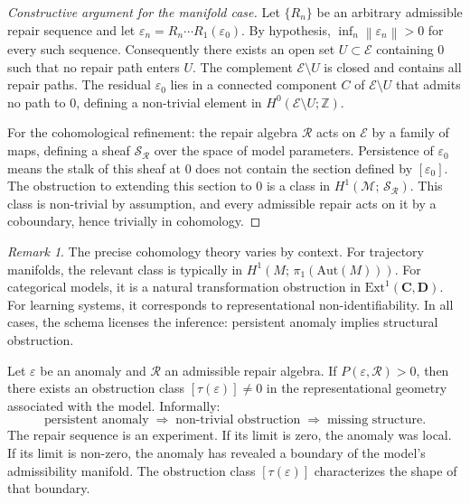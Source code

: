 \documentclass[12pt,oneside]{book}
\theoremstyle{plain}
\theoremstyle{definition}
\theoremstyle{remark}
\newtheorem{remark}[theorem]{Remark}
\newcommand{\R}{\mathcal{R}}
\newcommand{\M}{\mathcal{M}}
\newcommand{\eps}{\varepsilon}
\newcommand{\cat}[1]{\mathbf{#1}}
\newcommand{\norm}[1]{\left\lVert #1 \right\rVert}
\newcommand{\1}{\mathbf{1}}
\begin{document}
\begin{proof}[Constructive argument for the manifold case]
Let $\{R_n\}$ be an arbitrary admissible repair sequence and let $\eps_n = R_n \cdots R_1(\eps_0)$. By hypothesis, $\inf_n \norm{\eps_n} > 0$ for every such sequence. Consequently there exists an open set $U \subset \mathcal{E}$ containing $0$ such that no repair path enters $U$. The complement $\mathcal{E} \setminus U$ is closed and contains all repair paths. The residual $\eps_0$ lies in a connected component $C$ of $\mathcal{E} \setminus U$ that admits no path to $0$, defining a non-trivial element in $H^0(\mathcal{E} \setminus U; \mathbb{Z})$.

For the cohomological refinement: the repair algebra $\R$ acts on $\mathcal{E}$ by a family of maps, defining a sheaf $\mathcal{S}_{\R}$ over the space of model parameters. Persistence of $\eps_0$ means the stalk of this sheaf at $0$ does not contain the section defined by $[\eps_0]$. The obstruction to extending this section to $0$ is a class in $H^1(\M;\, \mathcal{S}_{\R})$. This class is non-trivial by assumption, and every admissible repair acts on it by a coboundary, hence trivially in cohomology.
\end{proof}

\begin{remark}
The precise cohomology theory varies by context. For trajectory manifolds, the relevant class is typically in $H^1(M;\, \pi_1(\mathrm{Aut}(M)))$. For categorical models, it is a natural transformation obstruction in $\mathrm{Ext}^1(\cat{C}, \cat{D})$. For learning systems, it corresponds to representational non-identifiability. In all cases, the schema licenses the inference: persistent anomaly implies structural obstruction.
\end{remark}

\begin{derivbox}[frametitle={Derivation 7: The Persistence--Obstruction Principle}]
Let $\eps$ be an anomaly and $\R$ an admissible repair algebra. If $P(\eps, \R) > 0$, then there exists an obstruction class $[\tau(\eps)] \neq 0$ in the representational geometry associated with the model. Informally:
\[
\text{persistent anomaly} \;\Rightarrow\; \text{non-trivial obstruction} \;\Rightarrow\; \text{missing structure.}
\]
The repair sequence is an experiment. If its limit is zero, the anomaly was local. If its limit is non-zero, the anomaly has revealed a boundary of the model's admissibility manifold. The obstruction class $[\tau(\eps)]$ characterizes the shape of that boundary.
\end{derivbox}
\end{document}
